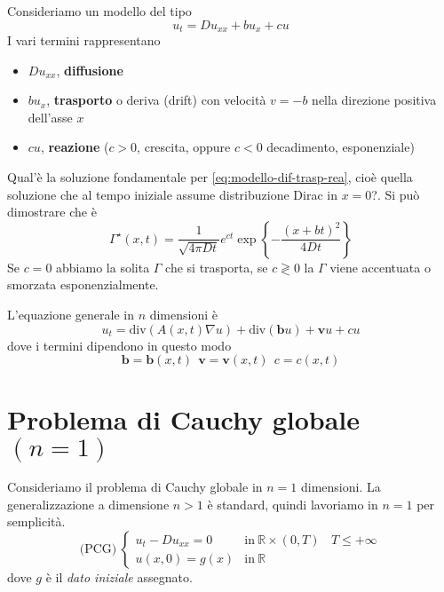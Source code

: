 \documentclass[10pt,a4paper,twoside,openright]{book}
\begin{document}
Consideriamo un modello del tipo
\begin{equation}
u_{t} =Du_{xx} +bu_{x} +cu
\label{eq:modello-dif-trasp-rea}
\end{equation}
I vari termini rappresentano
\begin{itemize}
\item $Du_{xx}$, \textbf{diffusione}
\item $bu_{x}$, \textbf{trasporto} o deriva (drift) con velocità $v=-b$ nella direzione positiva dell'asse $x$
\item $cu$, \textbf{reazione} ($c >0$, crescita, oppure $c< 0$ decadimento, esponenziale)
\end{itemize}

Qual'è la soluzione fondamentale per \eqref{eq:modello-dif-trasp-rea}, cioè quella soluzione che al tempo iniziale assume distribuzione Dirac in $x=0$?. Si può dimostrare che è
\begin{equation*}
\boxed{\Gamma ^{\star }(x,t) =\frac{1}{\sqrt{4\pi Dt}} e^{ct}\exp\left\{-\frac{(x+bt)^{2}}{4Dt}\right\}}
\end{equation*}
Se $c=0$ abbiamo la solita $\Gamma $ che si trasporta, se $c\gtrless 0$ la $\Gamma $ viene accentuata o smorzata esponenzialmente.

L'equazione generale in $n$ dimensioni è
\begin{equation*}
u_{t} =\mathrm{div}(A(x,t) \nabla u) +\mathrm{div}(\mathbf{b} u) +\mathbf{v} u+cu
\end{equation*}
dove i termini dipendono in questo modo
\begin{equation*}
\mathbf{b} =\mathbf{b}(x,t) \ \ \mathbf{v} =\mathbf{v}(x,t) \ \ c=c(x,t)
\end{equation*}
\section{Problema di Cauchy globale \texorpdfstring{$(n=1)$}{n = 1}}

Consideriamo il problema di Cauchy globale in $n=1$ dimensioni. La generalizzazione a dimensione $n >1$ è standard, quindi lavoriamo in $n=1$ per semplicità.
\begin{equation*}
\text{(PCG)} \ \begin{cases}
u_{t} -Du_{xx} =0 & \text{in} \ \mathbb{R} \times (0,T) \ \ \ \ T\leqslant +\infty \\
u(x,0) =g(x) & \text{in} \ \mathbb{R}
\end{cases}
\end{equation*}
dove $g$ è il \textit{dato iniziale} assegnato.
\end{document}
